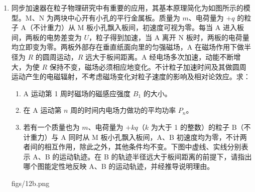 \documentclass[\gkver]{gaokaozhenti}
\begin{document}
\begin{enumerate}
{$F_{\text{安}}=m_{1}g\sin\theta+F_{\max}$

代入数据解得

$v=5\Ums$

（3）设 cd 棒的运动过程中电路中产生的总热量为 $Q_{\text{总}}$，由能量守恒有

$m_{2}g\sin\theta\cdot x=Q_{\text{总}}+\frac{1}{2}m_{2}v^{2}$

又

$Q=\frac{R_{1}}{R_{1}+R_{2}}Q_{\text{总}}$

解得

$Q=1.3\UJ$
}

\item
同步加速器在粒子物理研究中有重要的应用，其基本原理简化为如图所示的模型。M、N 为两块中心开有小孔的平行金属板。质量为 $m$、电荷量为 $+q$ 的粒子 A（不计重力）从 M 板小孔飘入板间，初速度可视为零。每当 A 进入板间，两板的电势差变为 $U$，粒子得到加速，当 A 离开 N 板时，两板的电荷量均立即变为零。两板外部存在垂直纸面向里的匀强磁场，A 在磁场作用下做半径为 $R$ 的圆周运动，$R$ 远大于板间距离。A 经电场多次加速，动能不断增大，为使 $R$ 保持不变，磁场必须相应地变化。不计粒子加速时间及其做圆周运动产生的电磁辐射，不考虑磁场变化对粒子速度的影响及相对论效应。求：
\begin{enumerate}
	\item
	A 运动第 1 周时磁场的磁感应强度 $B_{1}$ 的大小。
	\item
	在 A 运动第 $n$ 周的时间内电场力做功的平均功率 $P_{n}$。
	\item
	若有一个质量也为 $m$、电荷量为 $+kq$（$k$ 为大于 1 的整数）的粒子 B（不计重力）与 A 同时从 M 板小孔飘入板间，A、B 初速度均为零，不计两者间的相互作用，除此之外，其他条件均不变。下图中虚线、实线分别表示 A、B 的运动轨迹。在 B 的轨迹半径远大于板间距离的前提下，请指出哪个图能定性地反映 A、B 的运动轨迹，并经推导说明理由。
\end{enumerate}
{figs/12b.png}
\end{enumerate}
\end{document}
